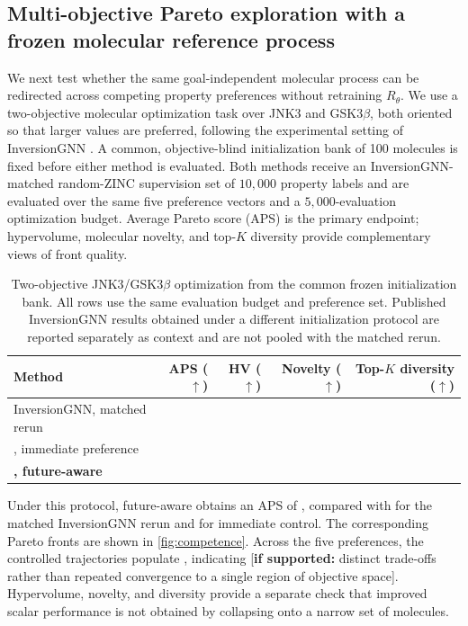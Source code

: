 \subsection{Multi-objective Pareto exploration with a frozen molecular reference process}
\label{sec:exp-pareto}

We next test whether the same goal-independent molecular process can be redirected across competing property preferences without retraining $R_\theta$. We use a two-objective molecular optimization task over JNK3 and GSK3$\beta$, both oriented so that larger values are preferred, following the experimental setting of InversionGNN \citep{niu2025inversiongnn}. A common, objective-blind initialization bank of 100 molecules is fixed before either method is evaluated. Both methods receive an InversionGNN-matched random-ZINC supervision set of $10{,}000$ property labels and are evaluated over the same five preference vectors and a $5{,}000$-evaluation optimization budget. Average Pareto score (APS) is the primary endpoint; hypervolume, molecular novelty, and top-$K$ diversity provide complementary views of front quality.

\begin{table}[t]
\centering
{\small
\begin{tabular}{lrrrr}
\toprule
Method & APS ($\uparrow$) & HV ($\uparrow$) & Novelty ($\uparrow$) & Top-$K$ diversity ($\uparrow$) \\
\midrule
InversionGNN, matched rerun & \XXX{} & \XXX{} & \XXX{} & \XXX{} \\
\method{}, immediate preference & \XXX{} & \XXX{} & \XXX{} & \XXX{} \\
\textbf{\method{}, future-aware} & \textbf{\XXX{}} & \textbf{\XXX{}} & \textbf{\XXX{}} & \textbf{\XXX{}} \\
\bottomrule
\end{tabular}}
\caption{\small Two-objective JNK3/GSK3$\beta$ optimization from the common frozen initialization bank. All rows use the same evaluation budget and preference set. Published InversionGNN results obtained under a different initialization protocol are reported separately as context and are not pooled with the matched rerun.}
\label{tab:pareto}
\end{table}

Under this protocol, future-aware \method{} obtains an APS of \textbf{\XXX{}}, compared with \textbf{\XXX{}} for the matched InversionGNN rerun and \textbf{\XXX{}} for immediate \method{} control. The corresponding Pareto fronts are shown in \cref{fig:competence}. Across the five preferences, the controlled trajectories populate \XXX{}, indicating {\color{red}[\textbf{if supported:} distinct trade-offs rather than repeated convergence to a single region of objective space]}. Hypervolume, novelty, and diversity provide a separate check that improved scalar performance is not obtained by collapsing onto a narrow set of molecules.

